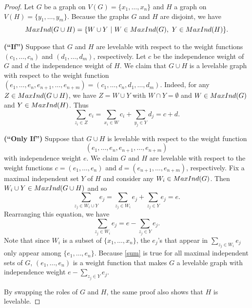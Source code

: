 \documentclass[10pt,a4paper]{amsart}
\begin{document}
\begin{proof}
Let $G$ be a graph 
on $V(G) = \{x_1,\ldots,x_n\}$ and
$H$ a graph on $V(H) = \{y_1,\ldots,y_m\}$.  
Because the graphs $G$ and $H$ are 
disjoint, we have
\[{\rm MaxInd}(G \cup H) = \{W \cup Y ~|~ W \in {\rm MaxInd}(G),~ 
Y \in {\rm MaxInd}(H)\}.\]

{\bf (``If'')} 
Suppose that $G$ and $H$ are levelable with respect to 
the weight functions $(c_1,\ldots,c_n)$ and 
$(d_1,\ldots,d_m)$, respectively.
Let $c$ be the independence weight of $G$ and $d$ the 
independence weight of $H$.
We claim that $G \cup H$ is a levelable graph
with respect to the weight function
$(e_1,\ldots,e_n,e_{n+1},\ldots,e_{n+m}) = (c_1,\ldots,c_n,d_1,\ldots,d_m)$.
Indeed, for any $Z \in {\rm MaxInd}(G \cup H)$,
we have $Z = W \cup Y$ with $W \cap Y = \emptyset$ and
$W \in {\rm MaxInd}(G)$ and $Y \in {\rm MaxInd}(H)$. Thus
\[\sum_{z_i \in Z} e_i = \sum_{x_i \in W} c_i + \sum_{y_j \in Y} d_j =
c+d.\]

{\bf (``Only If'')} 
Suppose that 
$G \cup H$ is levelable with respect to
the weight function \[(e_1,\ldots,e_n,e_{n+1},\ldots,e_{n+m})\]
with independence weight $e$.
We claim $G$ and $H$ are levelable with respect
to the weight functions
$c = (e_1,\ldots,e_n)$ and 
$d = (e_{n+1},\ldots,e_{n+m})$, respectively.  Fix a
maximal independent set $Y$ of $H$ and consider any
$W_i \in {\rm MaxInd}(G)$.  
Then $W_i \cup Y \in {\rm MaxInd}(G \cup H)$ and so
\[\sum_{z_j \in W_i \cup Y} e_j = \sum_{z_j \in W_i} e_j + 
\sum_{z_j \in Y} e_j = e.\]
Rearranging this equation, we have 
\begin{equation}\label{sum}
\sum_{z_j \in W_i}e_j = e - \sum_{z_j \in Y} e_j.
\end{equation}
Note that since $W_i$ is a subset of $\{x_1,\ldots,x_n\}$, the 
$e_j$'s that appear in $\sum_{z_j \in W_i}e_j$ only appear among
$\{e_1,\ldots,e_n\}$.  Because \eqref{sum} is true for 
all maximal independent sets of $G$, $(e_1,\ldots,e_n)$ is a
weight function that makes $G$ a levelable  
graph with independence weight $e - \sum_{z_j \in Y} e_j$.  

By swapping the roles of $G$ and $H$, the same proof also shows
that $H$ is levelable.
\end{proof}
\end{document}
